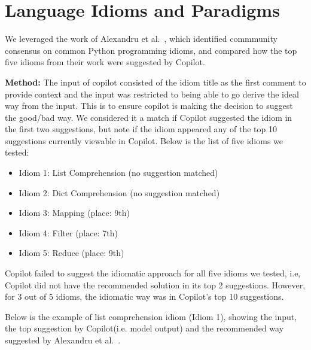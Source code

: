 \section{Language Idioms and Paradigms}
We leveraged the work of Alexandru et al.~\cite{Alexandru2018}, which identified commmunity consensus on common Python programming idioms, and compared how the top five idioms from their work were suggested by Copilot.

\noindent\textbf{Method:} %
The input of copilot consisted of the idiom title as the first comment to provide context and the input was restricted to being able to go derive the ideal way from the input. This is to ensure copilot is making the decision to suggest the good/bad way.
We considered it a match if Copilot suggested the idiom in the first two suggestions, but note if the idiom appeared any of the top 10 suggestions currently viewable in Copilot. 
\rohith{we could navigate through all suggestions with "alt+]" and "alt+[" listed in \href{https://github.com/github/copilot-docs/blob/main/docs/visualstudiocode/gettingstarted.md}{click here}}
Below is the list of five idioms we tested:
\begin{itemize}
    \item Idiom 1: List Comprehension (no suggestion matched)
    \item Idiom 2: Dict Comprehension (no suggestion matched)
    \item Idiom 3: Mapping (place: 9th)
    \item Idiom 4: Filter (place: 7th)
    \item Idiom 5: Reduce (place: 9th)
\end{itemize}

Copilot failed to suggest the idiomatic approach for all five idioms we tested, i.e, Copilot did not have the recommended solution in its top 2 suggestions. However, for 3 out of 5 idioms, the idiomatic way was in Copilot's top 10 suggestions.

Below is the example of list comprehension idiom (Idiom 1), showing the input, the top suggestion by Copilot(i.e. model output) and the recommended way suggested by Alexandru et al.~\cite{Alexandru2018}.

